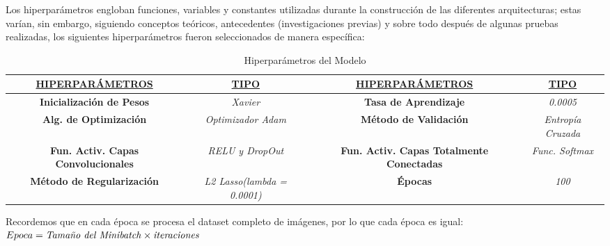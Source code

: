 	Los hiperparámetros engloban funciones, variables y constantes utilizadas durante la construcción de las diferentes arquitecturas; estas varían, sin embargo, siguiendo conceptos teóricos, antecedentes (investigaciones previas) y sobre todo después de algunas pruebas realizadas, los siguientes hiperparámetros fueron seleccionados de manera específica:
		\begin{table}[H]
			\begin{center}
			\caption{\small{Hiperparámetros del Modelo}}
			\begin{tabular}{|>{\scriptsize}c|>{\scriptsize}c|>{\scriptsize}c|>{\scriptsize}c|}
			\hline
			{\ul \textbf{HIPERPARÁMETROS}}  & {\ul \textbf{TIPO}}       & {\ul \textbf{HIPERPARÁMETROS}}        & {\ul \textbf{TIPO}}        \\ \hline
			{\textbf{Inicialización de Pesos}}                     		& {\textit{Xavier}}  				  &
			\textbf{Tasa de Aprendizaje}                                & \textit{0.0005}                    \\ \hline
			\textbf{Alg. de Optimización}                               & \textit{Optimizador Adam}          &
			\textbf{Método de Validación}                               & \textit{Entropía Cruzada}          \\ \hline
			\textbf{Fun. Activ. Capas Convolucionales}        			& \textit{RELU y DropOut}                      &
			\textbf{Fun. Activ. Capas Totalmente Conectadas} 			& \textit{Func. Softmax}           \\ \hline
			\textbf{Método de Regularización}                           &\textit{L2 Lasso(lambda = 0.0001)} &
			\textbf{Épocas}                                             &\textit{100}		 				\\ \hline
			\end{tabular}
			\end{center}
		\end{table}
		\vspace{-1.5em}

		Recordemos que en cada época se procesa el dataset completo de imágenes, por lo que cada época es igual: \begingroup\makeatletter\def\f@size{11}\check@mathfonts	$Epoca = \text{\textit{Tamaño del Minibatch}} \times \text{\textit{iteraciones}}$ \endgroup

